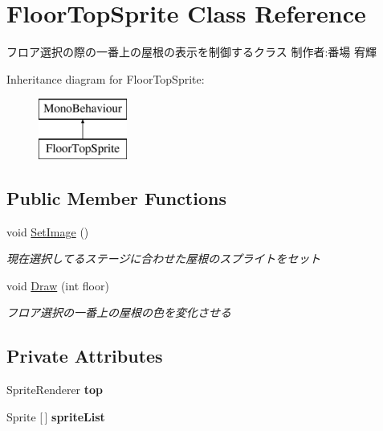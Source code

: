 \hypertarget{class_floor_top_sprite}{}\section{Floor\+Top\+Sprite Class Reference}
\label{class_floor_top_sprite}


フロア選択の際の一番上の屋根の表示を制御するクラス 制作者\+:番場 宥輝  


Inheritance diagram for Floor\+Top\+Sprite\+:\begin{figure}[H]
\begin{center}
\leavevmode
\includegraphics[height=2.000000cm]{class_floor_top_sprite}
\end{center}
\end{figure}
\subsection*{Public Member Functions}
\begin{DoxyCompactItemize}
\item 
void \hyperlink{class_floor_top_sprite_a0b915edb4da5734a6f5684e7085eaa4a}{Set\+Image} ()
\begin{DoxyCompactList}\small\item\em 現在選択してるステージに合わせた屋根のスプライトをセット \end{DoxyCompactList}\item 
void \hyperlink{class_floor_top_sprite_ae4e34479ffe93b85781f73276eaf84d8}{Draw} (int floor)
\begin{DoxyCompactList}\small\item\em フロア選択の一番上の屋根の色を変化させる \end{DoxyCompactList}\end{DoxyCompactItemize}
\subsection*{Private Attributes}
\begin{DoxyCompactItemize}
\item 
\mbox{\label{class_floor_top_sprite_a9a2f38daa9aa66cebaf4f24a6064bf05}} 
Sprite\+Renderer {\bfseries top}
\item 
\mbox{\label{class_floor_top_sprite_a95edffbab51577ae4121d3468f1712b1}} 
Sprite \mbox{[}$\,$\mbox{]} {\bfseries sprite\+List}
\end{DoxyCompactItemize}


